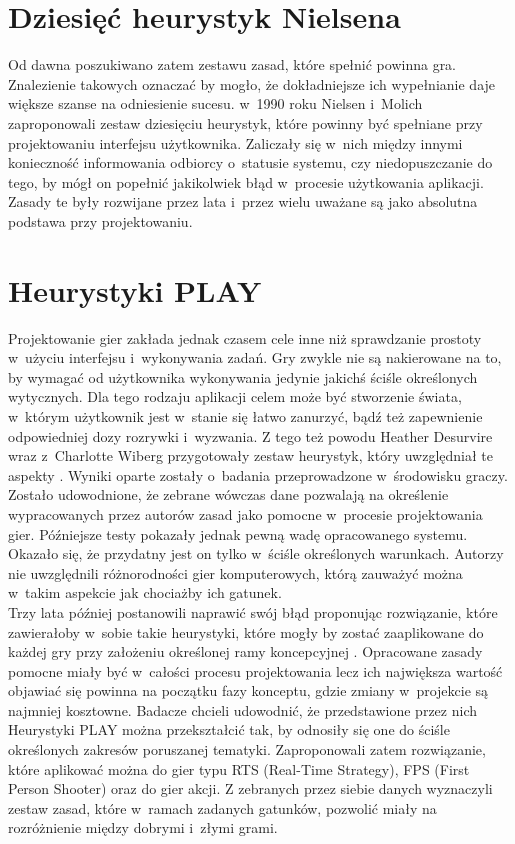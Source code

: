 \documentclass[a4paper,12pt,numbers=noenddot]{report}
\begin{document}
\section{Dziesięć heurystyk Nielsena}
Od dawna poszukiwano zatem zestawu zasad, które spełnić powinna gra. Znalezienie takowych oznaczać by mogło, że dokładniejsze ich wypełnianie daje większe szanse na odniesienie sucesu. w~1990 roku Nielsen i~Molich \cite{art_Nielsen} zaproponowali zestaw dziesięciu heurystyk, które powinny być spełniane przy projektowaniu interfejsu użytkownika. Zaliczały się w~nich między innymi konieczność informowania odbiorcy o~statusie systemu, czy niedopuszczanie do tego, by mógł on popełnić jakikolwiek błąd w~procesie użytkowania aplikacji. Zasady te były rozwijane przez lata i~przez wielu uważane są jako absolutna podstawa przy projektowaniu. 

\section{Heurystyki PLAY}
Projektowanie gier zakłada jednak czasem cele inne niż sprawdzanie prostoty w~użyciu interfejsu i~wykonywania zadań. Gry zwykle nie są nakierowane na to, by wymagać od użytkownika wykonywania jedynie jakichś ściśle określonych wytycznych. Dla tego rodzaju aplikacji celem może być stworzenie świata, w~którym użytkownik jest w~stanie się łatwo zanurzyć, bądź też zapewnienie odpowiedniej dozy rozrywki i~wyzwania. Z tego też powodu Heather Desurvire wraz z~Charlotte Wiberg przygotowały zestaw heurystyk, który uwzględniał te aspekty \cite{art_PLAY1}. Wyniki oparte zostały o~badania przeprowadzone w~środowisku graczy. Zostało udowodnione, że zebrane wówczas dane pozwalają na określenie wypracowanych przez autorów zasad jako pomocne w~procesie projektowania gier. Późniejsze testy pokazały jednak pewną wadę opracowanego systemu. Okazało się, że przydatny jest on tylko w~ściśle określonych warunkach. Autorzy nie uwzględnili różnorodności gier komputerowych, którą zauważyć można w~takim aspekcie jak chociażby ich gatunek. \\
Trzy lata później postanowili naprawić swój błąd proponując rozwiązanie, które zawierałoby w~sobie takie heurystyki, które mogły by zostać zaaplikowane do każdej gry przy założeniu określonej ramy koncepcyjnej \cite{art_PLAY2}. Opracowane zasady pomocne miały być w~całości procesu projektowania lecz ich największa wartość objawiać się powinna na początku fazy konceptu, gdzie zmiany w~projekcie są najmniej kosztowne. Badacze chcieli udowodnić, że przedstawione przez nich Heurystyki PLAY można przekształcić tak, by odnosiły się one do ściśle określonych zakresów poruszanej tematyki. Zaproponowali zatem rozwiązanie, które aplikować można do gier typu RTS (Real-Time Strategy), FPS (First Person Shooter) oraz do gier akcji. Z zebranych przez siebie danych wyznaczyli zestaw zasad, które w~ramach zadanych gatunków, pozwolić miały na rozróżnienie między dobrymi i~złymi grami. 
\end{document}
